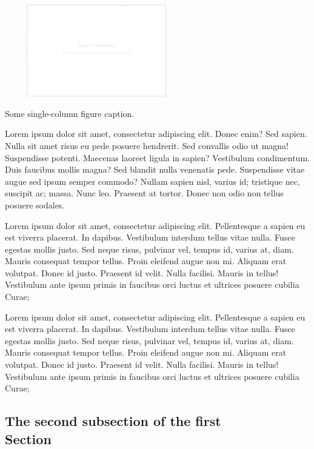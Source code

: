 \documentclass[a4paper,10pt]{article}
\makeatletter
\newenvironment{figurehere}{\def\@captype{figure}\vspace{2ex}}{\vspace{2ex}}
\makeatother
\begin{document}
\begin{multicols}{2}
\begin{figurehere}
 \centering
 \includegraphics[width=8cm, height=4cm]{./eps/placeholder.eps}
 \caption{Some single-column figure caption.}
 \label{fig:myfigure1}
\end{figurehere}

Lorem ipsum dolor sit amet, consectetur adipiscing elit. Donec enim? Sed sapien.
Nulla sit amet risus eu pede posuere hendrerit. Sed convallis odio ut magna!
Suspendisse potenti. Maecenas laoreet ligula in sapien? Vestibulum condimentum.
Duis faucibus mollis magna? Sed blandit nulla venenatis pede. Suspendisse vitae
augue sed ipsum semper commodo? Nullam sapien nisl, varius id; tristique nec,
suscipit ac; massa. Nunc leo. Praesent at tortor. Donec non odio non tellus
posuere sodales.

Lorem ipsum dolor sit amet, consectetur adipiscing elit. Pellentesque a sapien
eu est viverra placerat. In dapibus. Vestibulum interdum tellus vitae nulla.
Fusce egestas mollis justo. Sed neque risus, pulvinar vel, tempus id, varius at,
diam. Mauris consequat tempor tellus. Proin eleifend augue non mi. Aliquam erat
volutpat. Donec id justo. Praesent id velit. Nulla facilisi. Mauris in tellus!
Vestibulum ante ipsum primis in faucibus orci luctus et ultrices posuere cubilia
Curae;

Lorem ipsum dolor sit amet, consectetur adipiscing elit. Pellentesque a sapien
eu est viverra placerat. In dapibus. Vestibulum interdum tellus vitae nulla.
Fusce egestas mollis justo. Sed neque risus, pulvinar vel, tempus id, varius at,
diam. Mauris consequat tempor tellus. Proin eleifend augue non mi. Aliquam erat
volutpat. Donec id justo. Praesent id velit. Nulla facilisi. Mauris in tellus!
Vestibulum ante ipsum primis in faucibus orci luctus et ultrices posuere cubilia
Curae;


\subsection{The second subsection of the first \\ Section}


\end{multicols}
\end{document}
